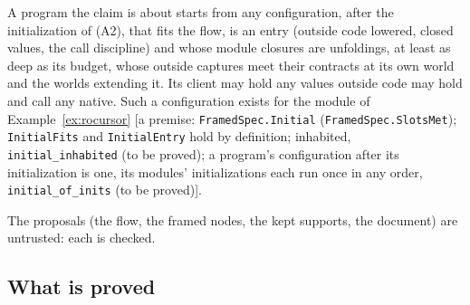 \documentclass[10pt,a4paper]{article}
\theoremstyle{definition}
\theoremstyle{remark}
\newcommand{\lean}[1]{\texttt{\small #1}}
\newcommand{\status}[1]{\textsf{\small[#1]}}
\begin{document}
\begin{description}[leftmargin=1.5em,style=nextline]
\item[The scope] A program the claim is about starts from any
configuration, after the initialization of (A2), that fits the flow, is
an entry (outside code lowered, closed values, the call discipline) and
whose module closures are unfoldings, at least as deep as its budget,
whose outside captures meet their contracts at its own world and the
worlds extending it. Its client may hold any values outside
code may hold and call any native. Such a configuration exists for the
module of Example~\ref{ex:rocursor}
\status{a premise: \lean{FramedSpec.Initial} (\lean{FramedSpec.SlotsMet}); \lean{InitialFits} and \lean{InitialEntry} hold by definition; inhabited, \lean{initial\_inhabited} (to be proved); a program's configuration after its initialization is one, its modules' initializations each run once in any order, \lean{initial\_of\_inits} (to be proved)}.
\end{description}
\noindent
The proposals (the flow, the framed nodes, the kept supports, the
document) are untrusted: each is checked.

\subsection{What is proved}\label{sec:accept-proof}
\end{document}

